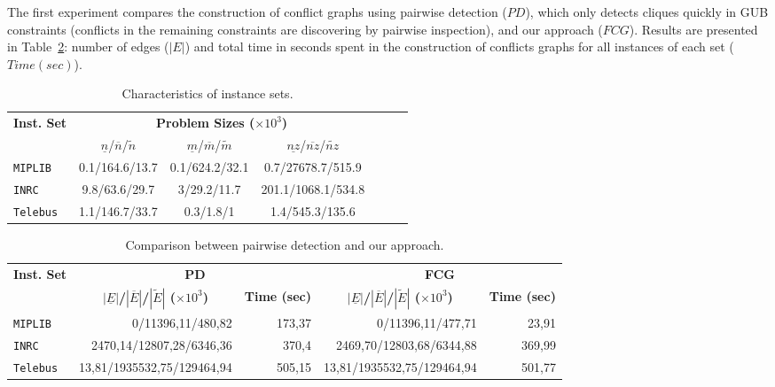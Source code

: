 \documentclass{endm}
\begin{document}
The first experiment compares the construction of conflict graphs using pairwise detection ($PD$), which only detects cliques quickly in GUB constraints (conflicts in the remaining constraints are discovering by pairwise inspection), and our approach ($FCG$). Results are presented in Table~\ref{tab:graph}: number of edges ($|E|$) and total time in seconds spent in the construction of conflicts graphs for all instances of each set ($Time (sec)$). 

\begin{table}[htbp]
\scriptsize
\caption{Characteristics of instance sets.}
\begin{center}
\begin{tabular}{|l|c|c|c|c|r|r|}
\hline 
\multirow{2}{0.8cm}{\textbf{Inst. Set}} & \multicolumn{3}{c|}{{\textbf{Problem Sizes ($\times10^{3}$)}}} \tabularnewline
\cline{2-4} 
 & {$\underline{n}$/$\overline{n}$/$\tilde{n}$} & {$\underline{m}$/$\overline{m}$/$\tilde{m}$} & {$\underline{nz}$/$\overline{nz}$/$\tilde{nz}$} \tabularnewline
\hline 
\hline 
\texttt{MIPLIB} & {0.1/164.6/13.7} & {0.1/624.2/32.1} & {0.7/27678.7/515.9}\tabularnewline
\hline 
\texttt{INRC} & {9.8/63.6/29.7} & {3/29.2/11.7} & {201.1/1068.1/534.8}\tabularnewline
\hline 
\texttt{Telebus} & {1.1/146.7/33.7} & {0.3/1.8/1} & {1.4/545.3/135.6}\tabularnewline
\hline 
\end{tabular}
\end{center}
\label{tab:inst}
\end{table}

\begin{table}[htbp]
\scriptsize
\caption{Comparison between pairwise detection and our approach.}
\begin{center}
\begin{tabular}{|l|r|r|r|r|}
\hline
\multirow{2}{0.8cm}{\textbf{Inst. Set}} & \multicolumn{ 2}{c|}{\textbf{PD}} & \multicolumn{ 2}{c|}{\textbf{FCG}} \\ \cline{ 2- 5}
\multicolumn{ 1}{|c|}{} & \multicolumn{1}{c|}{\textbf{$|\underline{E}|$/$|\overline{E}|$/$|\tilde{E}|$ ($\times10^{3}$)}} & \multicolumn{1}{c|}{\textbf{Time (sec)}} & \multicolumn{1}{c|}{\textbf{$|\underline{E}|$/$|\overline{E}|$/$|\tilde{E}|$ ($\times10^{3}$)}} & \multicolumn{1}{c|}{\textbf{Time (sec)}} \\ \hline
\texttt{MIPLIB} & 0/11396,11/480,82 & 173,37 & 0/11396,11/477,71 & 23,91 \\ \hline
\texttt{INRC} & 2470,14/12807,28/6346,36 & 370,4 & 2469,70/12803,68/6344,88 & 369,99 \\ \hline
\texttt{Telebus} & 13,81/1935532,75/129464,94 & 505,15 & 13,81/1935532,75/129464,94 & 501,77 \\ \hline
\end{tabular}
\end{center}
\label{tab:graph}
\end{table}
\end{document}

